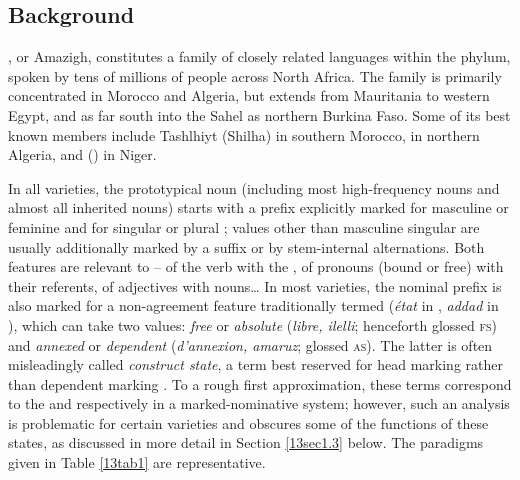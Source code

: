 \documentclass[output=paper,colorlinks,citecolor=brown]{langscibook}
\begin{document}
\subsection{Background} \label{13sec1.1}

, or Amazigh, constitutes a family of closely related languages within the  phylum, spoken by tens of millions of people across North Africa. The family is primarily concentrated in Morocco and Algeria, but extends from Mauritania to western Egypt, and as far south into the Sahel as northern Burkina Faso. Some of its best known members include Tashlhiyt (Shilha) in southern Morocco,  in northern Algeria, and  () in Niger.

In all  varieties, the prototypical noun (including most high-frequency nouns and almost all inherited nouns) starts with a prefix explicitly marked for masculine or feminine  and for singular or plural ; values other than masculine singular are usually additionally marked by a suffix or by stem-internal alternations. Both features are relevant to  -- of the verb with the , of pronouns (bound or free) with their referents, of adjectives with nouns\ldots{} In most varieties, the nominal prefix is also marked for a non-agreement feature traditionally termed \textit{} (\emph{état} in , \emph{addad} in ), which can take two values: \textit{free} or \textit{absolute} (\emph{libre, ilelli}; henceforth glossed \textsc{fs}) and \textit{annexed} or \textit{dependent} (\emph{d'annexion, amaruz}; glossed \textsc{as}). The latter is often misleadingly called \textit{construct state}, a term best reserved for head marking rather than dependent marking \citep{creissels2009-construct}. To a rough first approximation, these terms correspond to the  and  respectively in a marked-nominative  system; however, such an analysis is problematic for certain  varieties and obscures some of the functions of these states, as discussed in more detail in Section \ref{13sec1.3} below. The paradigms given in Table \ref{13tab1} are representative.
\end{document}
